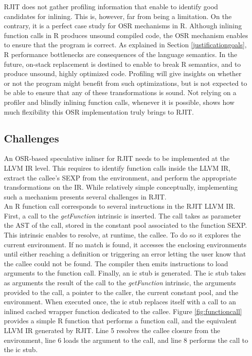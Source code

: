 RJIT does not gather profiling information that enable to identify good candidates for inlining.
This is, however, far from being a limitation.
On the contrary, it is a perfect case study for OSR mechanisms in R.
Although inlining function calls in R produces unsound compiled code, the OSR mechanism enables to ensure that the program is correct.
As explained in Section \ref{justificationgoals}, R performance bottlenecks are consequences of the language semantics.
In the future, on-stack replacement is destined to enable to break R semantics, and to produce unsound, highly optimized code.
Profiling will give insights on whether or not the program might benefit from such optimizations, but is not expected to be able to ensure that any of these transformations is sound.
Not relying on a profiler and blindly inlining function calls, whenever it is possible, shows how much flexibility this OSR implementation truly brings to RJIT.\\ 

\subsection{Challenges}
An OSR-based speculative inliner for RJIT needs to be implemented at the LLVM IR level.
This requires to identify function calls inside the LLVM IR, extract the callee's SEXP from the environment, and perform the appropriate transformations on the IR.
While relatively simple conceptually, implementing such a mechanism presents several challenges in RJIT.\\

An R function call corresponds to several instructions in the RJIT LLVM IR.
First, a call to the \textit{getFunction} intrinsic is inserted.
The call takes as parameter the AST of the call, stored in the constant pool associated to the function SEXP.
This intrinsic enables to resolve, at runtime, the callee. 
To do so it explores the current environment.
If no match is found, it accesses the enclosing environments until either reaching a definition or triggering an error letting the user know that the callee could not be found.
The compiler then emits instructions to load arguments to the function call.
Finally, an ic stub is generated. 
The ic stub takes as arguments the result of the call to the \textit{getFunction} intrinsic, the arguments provided to the call, a pointer to the caller, the current constant pool, and the environment.
When executed once, the ic stub replaces itself with a call to an inlined cached wrapper function dedicated to the callee.
Figure \ref{fig:functioncall} provides a simple R function that performs a function call, and the equivalent LLVM IR generated by RJIT.
Line 5 resolves the callee closure from the environment, line 6 loads the argument to the call, and line 8 performs the call to the ic stub.\\


